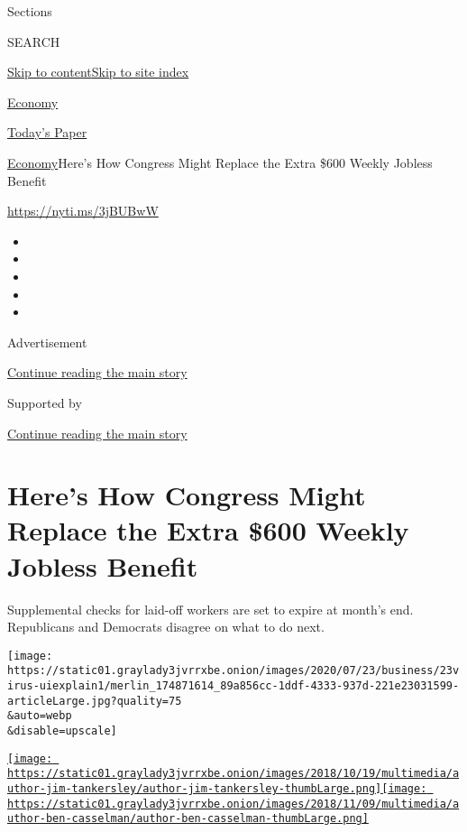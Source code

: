 Sections

SEARCH

\protect\hyperlink{site-content}{Skip to
content}\protect\hyperlink{site-index}{Skip to site index}

\href{https://www.nytimes3xbfgragh.onion/section/business/economy}{Economy}

\href{https://myaccount.nytimes3xbfgragh.onion/auth/login?response_type=cookie\&client_id=vi}{}

\href{https://www.nytimes3xbfgragh.onion/section/todayspaper}{Today's
Paper}

\href{/section/business/economy}{Economy}\textbar{}Here's How Congress
Might Replace the Extra \$600 Weekly Jobless Benefit

\url{https://nyti.ms/3jBUBwW}

\begin{itemize}
\item
\item
\item
\item
\item
\end{itemize}

Advertisement

\protect\hyperlink{after-top}{Continue reading the main story}

Supported by

\protect\hyperlink{after-sponsor}{Continue reading the main story}

\hypertarget{heres-how-congress-might-replace-the-extra-600-weekly-jobless-benefit}{%
\section{Here's How Congress Might Replace the Extra \$600 Weekly
Jobless
Benefit}\label{heres-how-congress-might-replace-the-extra-600-weekly-jobless-benefit}}

Supplemental checks for laid-off workers are set to expire at month's
end. Republicans and Democrats disagree on what to do next.

\texttt{[image: https://static01.graylady3jvrrxbe.onion/images/2020/07/23/business/23virus-uiexplain1/merlin\_174871614\_89a856cc-1ddf-4333-937d-221e23031599-articleLarge.jpg?quality=75\\\&auto=webp\\\&disable=upscale]}

\href{https://www.nytimes3xbfgragh.onion/by/jim-tankersley}{\texttt{[image: https://static01.graylady3jvrrxbe.onion/images/2018/10/19/multimedia/author-jim-tankersley/author-jim-tankersley-thumbLarge.png]}}\href{https://www.nytimes3xbfgragh.onion/by/ben-casselman}{\texttt{[image: https://static01.graylady3jvrrxbe.onion/images/2018/11/09/multimedia/author-ben-casselman/author-ben-casselman-thumbLarge.png]}}

